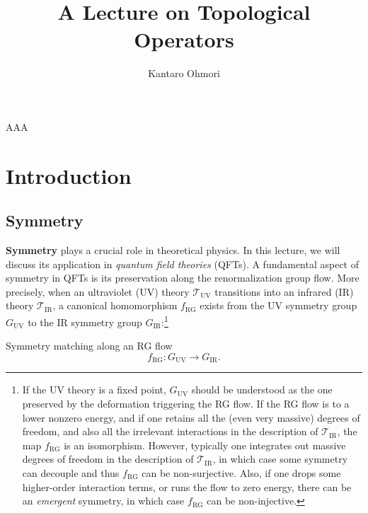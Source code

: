 \documentclass[11pt,toc=bibliography]{scrbook}
\title{A Lecture on Topological Operators}
\author[1]{Kantaro Ohmori}
\affil[1]{Department of Physics, The University of Tokyo, Bunkyo-ku, Tokyo 113-0033, Japan}
\date{}
\numberwithin{equation}{section}
\begin{document}
\maketitle

AAA

\setcounter{page}{0}

\thispagestyle{empty}

\newpage

\tableofcontents

\flushbottom

\chapter{Introduction}

\section{Symmetry}

\textbf{Symmetry} plays a crucial role in theoretical physics. In this lecture, we will discuss its application in \emph{quantum field theories} (QFTs). A fundamental aspect of symmetry in QFTs is its preservation along the renormalization group flow. More precisely, when an ultraviolet (UV) theory \(\mathcal{T}_\text{UV}\) transitions into an infrared (IR) theory \(\mathcal{T}_\text{IR}\), a canonical homomorphism \(f_\text{RG}\) exists from the UV symmetry group \(G_\text{UV}\) to the IR symmetry group \(G_\text{IR}\):\footnote{If the UV theory is a fixed point, \(G_\text{UV}\) should be understood as the one preserved by the deformation triggering the RG flow. If the RG flow is to a lower nonzero energy, and if one retains all the (even very massive) degrees of freedom, and also all the irrelevant interactions in the description of \(\mathcal{T}_\text{IR}\), the map \(f_\text{RG}\) is an isomorphism. However, typically one integrates out massive degrees of freedom in the description of \(\mathcal{T}_\text{IR}\), in which case some symmetry can decouple and thus \(f_\text{RG}\) can be non-surjective. Also, if one drops some higher-order interaction terms, or runs the flow to zero energy, there can be an \emph{emergent} symmetry, in which case \(f_\text{RG}\) can be non-injective.}

\begin{important}{Symmetry matching along an RG flow}
  \begin{equation}
    f_\text{RG} : G_\text{UV} \to G_\text{IR}.
  \end{equation}
\end{important}
\end{document}
